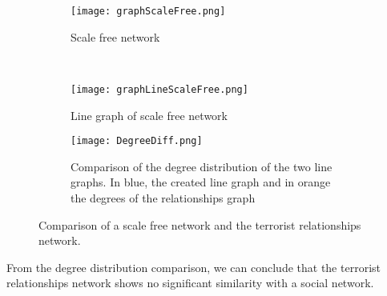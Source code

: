\begin{figure}[H]
\begin{center}
    \begin{subfigure}[b]{0.45\textwidth}
        \texttt{[image: graphScaleFree.png]}
        \caption{Scale free network}
        \label{fig:Scalefree}
    \end{subfigure}
    ~
    \begin{subfigure}[b]{0.45\textwidth}
        \texttt{[image: graphLineScaleFree.png]}
        \caption{Line graph of scale free network}
        \label{fig:lineG}
    \end{subfigure}
    
    \begin{subfigure}[b]{\textwidth}
    	\begin{centering}
        \texttt{[image: DegreeDiff.png]}
        \caption{\centering Comparison of the degree distribution of the two line graphs. In blue, the created line graph and in orange the degrees of the relationships graph}
        \label{fig:DegDiff}
        \end{centering}
    \end{subfigure}
\caption{Comparison of a scale free network and the terrorist relationships network.}
\label{fig:RelationshipScaleFree}
\end{center}
\end{figure}

From the degree distribution comparison, we can conclude that the terrorist relationships network shows no significant similarity with a  social network. 
%
